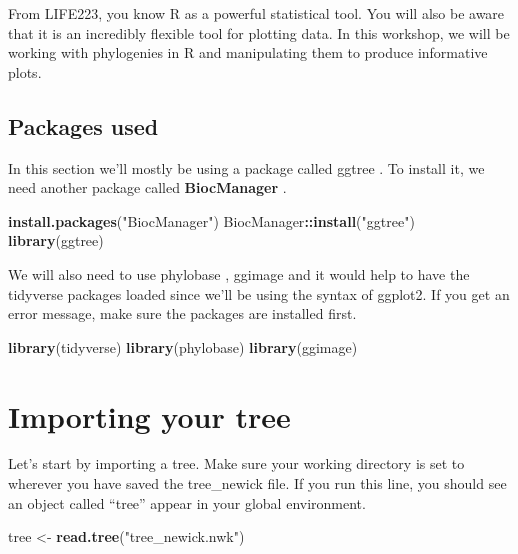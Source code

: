 \documentclass[
]{book}
\newenvironment{Shaded}{\begin{snugshade}}{\end{snugshade}}
\newcommand{\KeywordTok}[1]{\textcolor[rgb]{0.13,0.29,0.53}{\textbf{#1}}}
\newcommand{\NormalTok}[1]{#1}
\newcommand{\OperatorTok}[1]{\textcolor[rgb]{0.81,0.36,0.00}{\textbf{#1}}}
\newcommand{\StringTok}[1]{\textcolor[rgb]{0.31,0.60,0.02}{#1}}
\begin{document}
From LIFE223, you know R as a powerful statistical tool. You will also be aware that it is an incredibly flexible tool for plotting data. In this workshop, we will be working with phylogenies in R and manipulating them to produce informative plots.

\hypertarget{packages-used}{%
\subsection{Packages used}\label{packages-used}}

In this section we'll mostly be using a package called ggtree \citep{Yu17, Yu18}. To install it, we need another package called \textbf{BiocManager} \citep{Morgan19}.

\begin{Shaded}
\begin{Highlighting}[]
\KeywordTok{install.packages}\NormalTok{(}\StringTok{"BiocManager"}\NormalTok{)}
\NormalTok{BiocManager}\OperatorTok{::}\KeywordTok{install}\NormalTok{(}\StringTok{"ggtree"}\NormalTok{)}
\KeywordTok{library}\NormalTok{(ggtree)}
\end{Highlighting}
\end{Shaded}

We will also need to use phylobase \citep{phylobase}, ggimage \citep{Yu19} and it would help to have the tidyverse packages loaded \citep{Wickham17} since we'll be using the syntax of ggplot2. If you get an error message, make sure the packages are installed first.

\begin{Shaded}
\begin{Highlighting}[]
\KeywordTok{library}\NormalTok{(tidyverse)}
\KeywordTok{library}\NormalTok{(phylobase)}
\KeywordTok{library}\NormalTok{(ggimage)}
\end{Highlighting}
\end{Shaded}

\hypertarget{importing-your-tree}{%
\section{Importing your tree}\label{importing-your-tree}}

Let's start by importing a tree. Make sure your working directory is set to wherever you have saved the tree\_newick file. If you run this line, you should see an object called ``tree'' appear in your global environment.

\begin{Shaded}
\begin{Highlighting}[]
\NormalTok{tree \textless{}{-}}\StringTok{ }\KeywordTok{read.tree}\NormalTok{(}\StringTok{"tree\_newick.nwk"}\NormalTok{)}
\end{Highlighting}
\end{Shaded}
\end{document}

